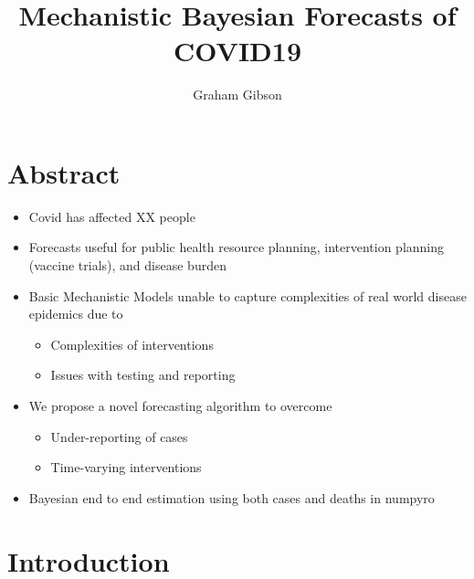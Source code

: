 \documentclass[11pt]{amsart}
\title{Mechanistic Bayesian Forecasts of COVID19}
\author{Graham Gibson}
\begin{document}
\section*{Abstract}
\begin{itemize}
\item Covid has affected XX people
\item Forecasts useful for public health resource planning, intervention planning (vaccine trials), and disease burden
\item Basic Mechanistic Models unable to capture complexities of real world disease epidemics due to 
\begin{itemize}
\item Complexities of interventions 
\item Issues with testing and reporting
\end{itemize}
\item We propose a novel forecasting algorithm to overcome 
\begin{itemize}
\item Under-reporting of cases
\item Time-varying interventions
\end{itemize}
\item Bayesian end to end estimation using both cases and deaths in numpyro
\end{itemize}


\maketitle


\section{Introduction}
\end{document}
